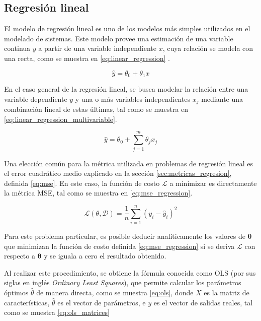 \subsection{Regresión lineal}
\label{sec:regresion_lineal}
El modelo de regresión lineal es uno de los modelos más simples utilizados en el modelado de sistemas. Este modelo provee una estimación de una variable continua $y$ a partir de una variable independiente $x$, cuya relación se modela con una recta, como se muestra en \eqref{eq:linear_regression} \cite{Bishop2006}.

\begin{equation}
    \label{eq:linear_regression}
    \hat{y} = \theta_0 + \theta_1 x
\end{equation}

En el caso general de la regresión lineal, se busca modelar la relación entre una variable dependiente $y$ y una o más variables independientes $x_j$ mediante una combinación lineal de estas últimas, tal como se muestra en \eqref{eq:linear_regression_multivariable}.

\begin{equation}
    \label{eq:linear_regression_multivariable}
    \hat{y} = \theta_0 + \sum_{j=1}^{m} \theta_j x_j
\end{equation}

Una elección común para la métrica utilizada en problemas de regresión lineal es el error cuadrático medio explicado en la sección \ref{sec:metricas_regresion}, definida \eqref{eq:mse}. En este caso, la función de costo $\mathcal{L}$ a minimizar es directamente la métrica MSE, tal como se muestra en \eqref{eq:mse_regression}.

\begin{equation}
    \label{eq:mse_regression}
    \mathcal{L}(\theta, \mathcal{D}) = \frac{1}{n} \sum_{i=1}^{n} (y_i - \hat{y}_i)^2
\end{equation}

Para este problema particular, es posible deducir analíticamente los valores de $\mathbf{\theta}$ que minimizan la función de costo definida \eqref{eq:mse_regression}
si se deriva $\mathcal{L}$ con respecto a $\mathbf{\theta}$ y se iguala a cero el resultado obtenido.

Al realizar este procedimiento, se obtiene la fórmula conocida como OLS (por sus siglas en inglés \textit{Ordinary Least Squares}), que permite calcular los parámetros óptimos $\hat{\theta}$ de manera directa, como se muestra \eqref{eq:ols}, donde $X$ es la matriz de características, $\hat{\theta}$ es el vector de parámetros, e $y$ es el vector de salidas reales, tal como se muestra \eqref{eq:ols_matrices} \cite{Bishop2006}

